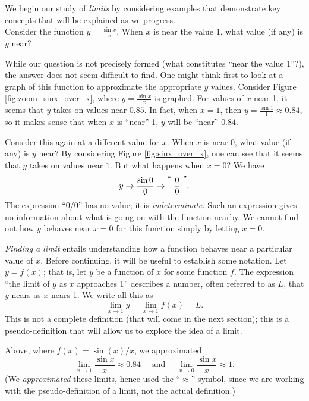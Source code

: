 We begin our study of \textit{limits} by considering examples that demonstrate key concepts that will be explained as we progress.\\

Consider the function $y = \frac{\sin x}{x}$. When $x$ is near the value 1, what value (if any) is $y$ near?%

While our question is not precisely formed (what constitutes ``near the value 1''?), the answer does not seem difficult to find. One might think first to look at a graph of this function to approximate the appropriate $y$ values. Consider Figure \ref{fig:zoom_sinx_over_x}, where $y = \frac{\sin x}{x}$ is graphed. For values of $x$ near 1, it seems that $y$ takes on values near $0.85$. In fact, when $x=1$, then $y=\frac{\sin 1}{1} \approx 0.84$, so it makes sense that when $x$ is ``near'' 1, $y$ will be ``near'' $0.84$.

Consider this again at a different value for $x$. When $x$ is near 0, what value (if any) is $y$ near? By considering Figure \ref{fig:sinx_over_x}, one can see that it seems that $y$ takes on values near $1$. But what happens when $x=0$? We have $$ y \rightarrow \frac{\sin 0}{0} \rightarrow \raisebox{8pt}{\text{``\ }}\frac{0}{0}\raisebox{8pt}{\text{\ ''}}.$$ 
The expression ``$0/0$'' has no value; it is \emph{indeterminate.}  Such an expression gives no information about what is going on with the function nearby. We cannot find out how $y$ behaves near $x=0$ for this function simply by letting $x=0$. 

\emph{Finding a limit} entails understanding how a function behaves near a particular value of $x$. Before continuing, it will be useful to establish some notation. Let $y=f(x)$; that is, let $y$ be a function of $x$ for some function $f$. The expression ``the limit of $y$ as $x$ approaches 1'' describes a number, often referred to as $L$, that $y$ nears as $x$ nears 1. We write all this as $$\lim_{x\to 1} y = \lim_{x\to 1} f(x) = L.$$ This is not a complete definition (that will come in the next section); this is a pseudo-definition that will allow us to explore the idea of a limit. 

Above, where $f(x) = \sin(x)/x$, we approximated $$\lim_{x\to 1} \frac{\sin x}{x} \approx 0.84 \quad \text{ and } \quad \lim_{x\to 0}\frac{\sin x}{x} \approx 1.$$ (We \textit{approximated} these limits, hence used the ``$\approx$'' symbol, since we are working with the pseudo-definition of a limit, not the actual definition.)

